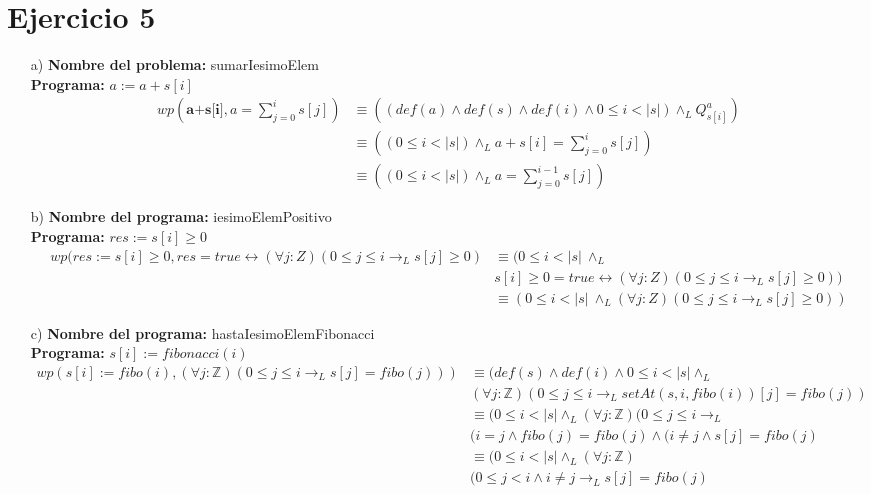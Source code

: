 \documentclass{article}
\begin{document}
{\section*{Ejercicio 5}
\begin{itemize}
    \item [a) ] \textbf{Nombre del problema:} sumarIesimoElem\\
    \textbf{Programa: } $a:=a+s[i]$\\
    \setcounter{equation}{0}
    \begin{align}
        wp(\textbf{a+s[i]},a=\displaystyle\sum_{j=0}^{i}s[j])&\equiv ((def(a)\land def(s)\land def(i)\land 0\leq i<|s|)\land_L Q^a_{s[i]})\\
        &\equiv ((0\leq i<|s|)\land_L a+s[i]=\displaystyle\sum_{j=0}^{i}s[j])\\
        &\equiv ((0\leq i<|s|)\land_L a=\displaystyle\sum_{j=0}^{i-1}s[j])
    \end{align}
    \item [b) ] \textbf{Nombre del programa:} iesimoElemPositivo\\
    \textbf{Programa: } $res:=s[i]\geq0$\\
    \setcounter{equation}{0}
    \begin{align}
        wp(res:=s[i]\geq0,res = true \leftrightarrow (\forall j :Z)(0 \leq j \leq i \to_L s[j] \geq 0)&\equiv (0\leq i<|s|\ \land_L\\\nonumber 
        & s[i]\geq0 = true \leftrightarrow(\forall j :Z)(0 \leq j \leq i \to_L s[j] \geq 0))\\
        &\equiv (0\leq i<|s|\ \land_L(\forall j :Z)(0 \leq j \leq i \to_L s[j] \geq 0))
    \end{align}
    \item [c) ] \textbf{Nombre del programa:} hastaIesimoElemFibonacci\\
    \textbf{Programa: } $s[i]:=fibonacci(i)$\\
    \setcounter{equation}{0}
    \begin{align}
        wp(s[i]:=fibo(i),(\forall j:\mathbb{Z})(0\leq j\leq i \to_L s[j]=fibo(j)))&\equiv (def(s)\land def(i)\land 0\leq i<|s| \land_L \\\nonumber
        &(\forall j:\mathbb{Z})(0\leq j\leq i \to_L setAt(s,i,fibo(i))[j]=fibo(j))\\
        &\equiv (0\leq i<|s| \land_L(\forall j:\mathbb{Z})(0\leq j\leq i \to_L\\\nonumber 
        &(i=j\land fibo(j)=fibo(j)\land(i\neq j \land s[j]=fibo(j)\\
        &\equiv (0\leq i<|s| \land_L(\forall j:\mathbb{Z})\\\nonumber
        &(0\leq j< i \land i\neq j \to_L s[j]=fibo(j)\\
    \end{align}
\end{itemize}
}
\end{document}
